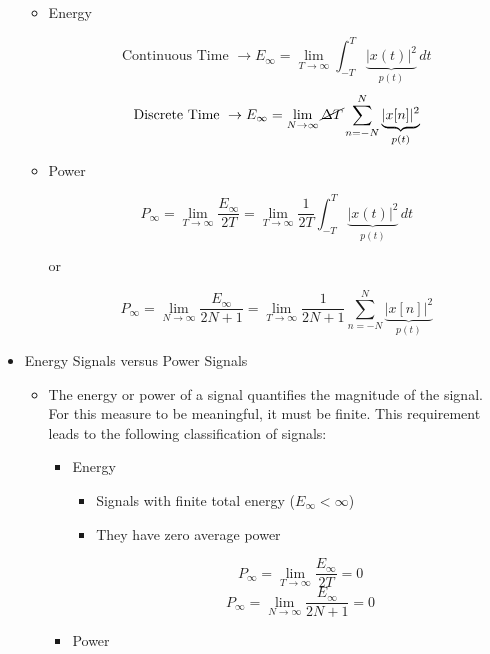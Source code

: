 \begin{itemize}
\begin{itemize}
      \item Energy

        $$\text{Continuous Time } \to E_{\infty}=\lim_{T\to\infty}\int_{-T}^{T} \underbrace{|x(t)|^2}_{p(t)}\,dt$$
        $$\text{Discrete Time } \to E_{\infty}=\lim_{N\to\infty}\cancel{\Delta T}\sum_{n=-N}^{N}\underbrace{|x[n]|^2}_{p(t)}$$

      \item Power

        $$P_{\infty}=\lim_{T\to\infty}\frac{E_{\infty}}{2T}=\lim_{T\to\infty}\frac{1}{2T}\int_{-T}^{T} \underbrace{|x(t)|^2}_{p(t)}\,dt$$
        \begin{center}
          or
        \end{center}
        $$P_{\infty}=\lim_{N\to\infty}\frac{E_{\infty}}{2N+1}=\lim_{T\to\infty}\frac{1}{2N+1}\sum_{n=-N}^{N}\underbrace{|x[n]|^2}_{p(t)}$$

    \end{itemize}

  \item Energy Signals versus Power Signals

    \begin{itemize}

      \item The energy or power of a signal quantifies the magnitude of the signal. For this measure to be meaningful, it must be finite. This requirement leads to the following classification of signals:

        \begin{itemize}

          \item Energy

            \begin{itemize}

              \item Signals with finite total energy ($E_{\infty}<\infty$)

              \item They have zero average power

                $$P_{\infty}=\lim_{T\to\infty}\frac{E_{\infty}}{2T}=0$$
                $$P_{\infty}=\lim_{N\to\infty}\frac{E_{\infty}}{2N+1}=0$$

            \end{itemize}

          \item Power

            \begin{itemize}


\end{itemize}
\end{itemize}
\end{itemize}
\end{itemize}
